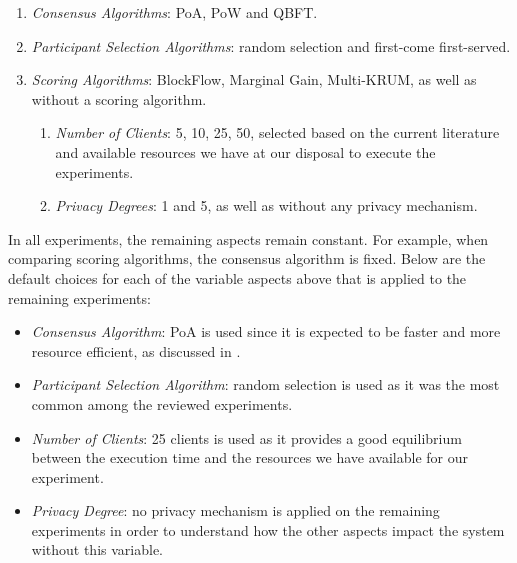 \begin{enumerate}
    \item \textit{Consensus Algorithms}: PoA, PoW and QBFT.
    
    \item \textit{Participant Selection Algorithms}: random selection and first-come first-served.
    
    \item \textit{Scoring Algorithms}: BlockFlow, Marginal Gain, Multi-KRUM, as well as without a scoring algorithm.
    
        \begin{enumerate}
            \item \textit{Number of Clients}: 5, 10, 25, 50, selected based on the current literature and available resources we have at our disposal to execute the experiments.
    
            \item \textit{Privacy Degrees}: 1 and 5, as well as without any privacy mechanism.
        \end{enumerate}
\end{enumerate}

In all experiments, the remaining aspects remain constant. For example, when comparing scoring algorithms, the consensus algorithm is fixed. Below are the default choices for each of the variable aspects above that is applied to the remaining experiments:

\begin{itemize}
    \item \textit{Consensus Algorithm}: PoA is used since it is expected to be faster and more resource efficient, as discussed in .
    
    \item \textit{Participant Selection Algorithm}: random selection is used as it was the most common among the reviewed experiments.
    
    \item \textit{Number of Clients}: 25 clients is used as it provides a good equilibrium between the execution time and the resources we have available for our experiment.
    
    \item \textit{Privacy Degree}: no privacy mechanism is applied on the remaining experiments in order to understand how the other aspects impact the system without this variable.
\end{itemize}

